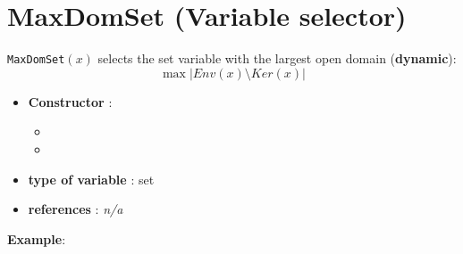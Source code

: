 \section{MaxDomSet (Variable selector)}\label{maxdomset:maxdomsetvarselector}\hypertarget{maxdomset:maxdomsetvarselector}{}
\begin{notedef}
  \texttt{MaxDomSet}$(x)$ selects the set variable with the largest open domain (\textbf{dynamic}):
$$\max |Env(x)\setminus Ker(x)|$$
\end{notedef}

\begin{itemize}
	\item \textbf{Constructor} : 
	\begin{itemize}
	\item {}
	\item {}
	\end{itemize}	
	\item \textbf{type of variable} : set
	\item \textbf{references} : \emph{n/a}
\end{itemize}

\textbf{Example}:
%

